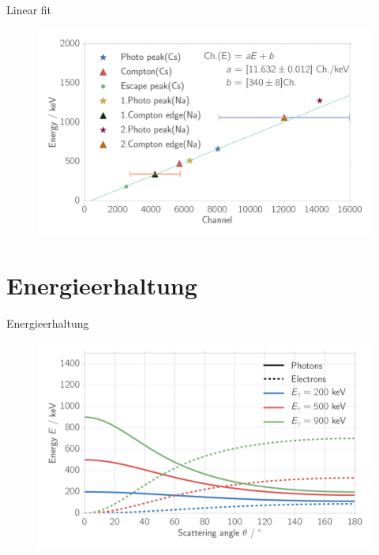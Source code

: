 \documentclass[xcolor=x11names,compress]{beamer}
\renewcommand{\(}{\begin{columns}}
\renewcommand{\)}{\end{columns}}
\newcommand{\<}[1]{\begin{column}{#1}}
\renewcommand{\>}{\end{column}}
\begin{document}
\begin{frame}[t]{Linear fit}
 \begin{figure}[htpb]
    \centering
    \includegraphics[width=1.0\linewidth]{../analysis/figures/calibration_na_linear_fit}
    \label{fig:calibration_na_linear_fit}
\end{figure}
\end{frame}

\section{Energieerhaltung}
\begin{frame}[t]{Energieerhaltung}
\begin{figure}[htpb]
    \centering
    \includegraphics[width=1.0\linewidth]{../analysis/figures/theory_conservation}
\label{fig:theory_cons}
\end{figure}
\end{frame}
\end{document}

